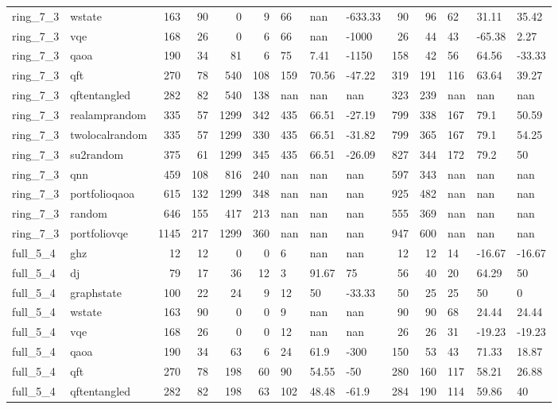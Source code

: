 \begin{longtable}{llrrrrlllrrlll}
ring\_7\_3 & wstate & 163 & 90 & 0 & 9 & 66 & nan & -633.33 & 90 & 96 & 62 & 31.11 & 35.42 \\
ring\_7\_3 & vqe & 168 & 26 & 0 & 6 & 66 & nan & -1000 & 26 & 44 & 43 & -65.38 & 2.27 \\
ring\_7\_3 & qaoa & 190 & 34 & 81 & 6 & 75 & 7.41 & -1150 & 158 & 42 & 56 & 64.56 & -33.33 \\
ring\_7\_3 & qft & 270 & 78 & 540 & 108 & 159 & 70.56 & -47.22 & 319 & 191 & 116 & 63.64 & 39.27 \\
ring\_7\_3 & qftentangled & 282 & 82 & 540 & 138 & nan & nan & nan & 323 & 239 & nan & nan & nan \\
ring\_7\_3 & realamprandom & 335 & 57 & 1299 & 342 & 435 & 66.51 & -27.19 & 799 & 338 & 167 & 79.1 & 50.59 \\
ring\_7\_3 & twolocalrandom & 335 & 57 & 1299 & 330 & 435 & 66.51 & -31.82 & 799 & 365 & 167 & 79.1 & 54.25 \\
ring\_7\_3 & su2random & 375 & 61 & 1299 & 345 & 435 & 66.51 & -26.09 & 827 & 344 & 172 & 79.2 & 50 \\
ring\_7\_3 & qnn & 459 & 108 & 816 & 240 & nan & nan & nan & 597 & 343 & nan & nan & nan \\
ring\_7\_3 & portfolioqaoa & 615 & 132 & 1299 & 348 & nan & nan & nan & 925 & 482 & nan & nan & nan \\
ring\_7\_3 & random & 646 & 155 & 417 & 213 & nan & nan & nan & 555 & 369 & nan & nan & nan \\
ring\_7\_3 & portfoliovqe & 1145 & 217 & 1299 & 360 & nan & nan & nan & 947 & 600 & nan & nan & nan \\
full\_5\_4 & ghz & 12 & 12 & 0 & 0 & 6 & nan & nan & 12 & 12 & 14 & -16.67 & -16.67 \\
full\_5\_4 & dj & 79 & 17 & 36 & 12 & 3 & 91.67 & 75 & 56 & 40 & 20 & 64.29 & 50 \\
full\_5\_4 & graphstate & 100 & 22 & 24 & 9 & 12 & 50 & -33.33 & 50 & 25 & 25 & 50 & 0 \\
full\_5\_4 & wstate & 163 & 90 & 0 & 0 & 9 & nan & nan & 90 & 90 & 68 & 24.44 & 24.44 \\
full\_5\_4 & vqe & 168 & 26 & 0 & 0 & 12 & nan & nan & 26 & 26 & 31 & -19.23 & -19.23 \\
full\_5\_4 & qaoa & 190 & 34 & 63 & 6 & 24 & 61.9 & -300 & 150 & 53 & 43 & 71.33 & 18.87 \\
full\_5\_4 & qft & 270 & 78 & 198 & 60 & 90 & 54.55 & -50 & 280 & 160 & 117 & 58.21 & 26.88 \\
full\_5\_4 & qftentangled & 282 & 82 & 198 & 63 & 102 & 48.48 & -61.9 & 284 & 190 & 114 & 59.86 & 40 \\

\end{longtable}
